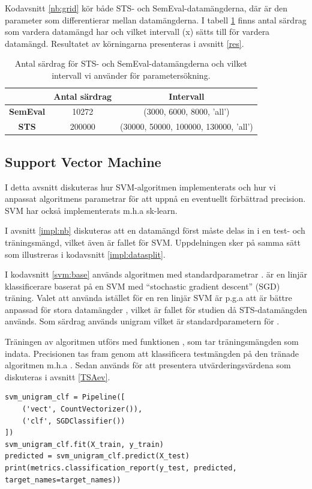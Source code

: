 \documentclass{kaumasters} %
\begin{document}
Kodavsnitt \ref{nb:grid} kör både STS- och SemEval-datamängderna, där  är den parameter som differentierar mellan datamängderna. I tabell \ref{tab:kbest} finns antal särdrag som vardera datamängd har och vilket intervall (x) sätts till för vardera datamängd. Resultatet av körningarna presenteras i avsnitt \ref{res}.

\begin{table}
\centering
\caption{Antal särdrag för STS- och SemEval-datamängderna och vilket intervall vi använder för parametersökning.}
\label{tab:kbest}
    \begin{tabular}{ccc}
    \toprule
     & \textbf{Antal särdrag} & \textbf{Intervall} \\
    \midrule
    \textbf{SemEval} & 10272 & (3000, 6000, 8000, 'all') \\ 
    \textbf{STS} & 200000 & (30000, 50000, 100000, 130000, 'all') \\
    \bottomrule
\end{tabular}
\end{table}




\subsection{Support Vector Machine}\label{impl:svm}
I detta avsnitt diskuteras hur SVM-algoritmen implementerats och hur vi anpassat algoritmens parametrar för att uppnå en eventuellt förbättrad precision. SVM har också implementerats m.h.a sk-learn.

I avsnitt \ref{impl:nb} diskuteras att en datamängd först måste delas in i en test- och träningsmängd, vilket även är fallet för SVM. Uppdelningen sker på samma sätt som illustreras i kodavsnitt \ref{impl:datasplit}. 

I kodavsnitt \ref{svm:base} används algoritmen  med standardparametrar \cite{scikit:009}.  är en linjär klassificerare baserat på en SVM med “stochastic gradient descent” (SGD) träning. Valet att använda  istället för en ren linjär SVM är p.g.a att  är bättre anpassad för stora datamängder \cite{scikit:008}, vilket är fallet för studien då STS-datamängden används. Som särdrag används unigram vilket är standardparametern för .

Träningen av algoritmen utförs med funktionen , som tar träningsmängden som indata. Precisionen tas fram genom att klassificera testmängden på den tränade algoritmen m.h.a . Sedan används  för att presentera utvärderingsvärdena som diskuteras i avsnitt \ref{TSAev}.
\begin{lstlisting}[style=mypython,caption={Kod för att skapa och träna SVM-klassificeraren.},label=svm:base]
svm_unigram_clf = Pipeline([
	('vect', CountVectorizer()), 
	('clf', SGDClassifier())
])
svm_unigram_clf.fit(X_train, y_train)
predicted = svm_unigram_clf.predict(X_test)
print(metrics.classification_report(y_test, predicted, target_names=target_names))
\end{lstlisting}
\end{document}
